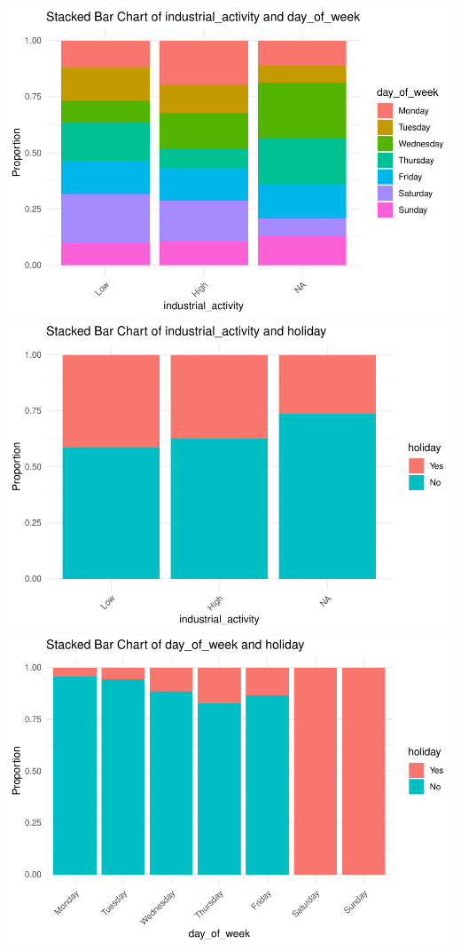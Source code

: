 \documentclass[12pt,halfline,a4paper,]{ouparticle}
\begin{document}
\includegraphics{Report_files/figure-latex/unnamed-chunk-4-1.pdf}
\includegraphics{Report_files/figure-latex/unnamed-chunk-4-2.pdf}
\includegraphics{Report_files/figure-latex/unnamed-chunk-4-3.pdf}
\end{document}
